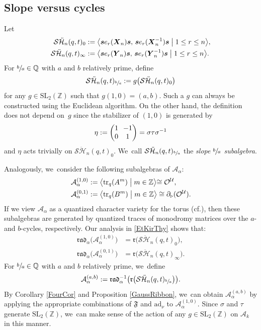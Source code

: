\documentclass[11pt]{article}
\newcommand{\cf}{cf.\xspace}
\newcommand{\SL}{\mathrm{SL}}
\theoremstyle{definition}
\newcommand{\QQ}{\mathbb{Q}}
\newcommand{\ZZ}{\mathbb{Z}}
\newcommand{\OO}{\mathcal{O}}
\newcommand{\UU}{\mathcal{U}}
\newcommand{\AAA}{\mathcal{A}}
\newcommand{\SHH}{\mathcal{S}\ddot{\mathcal{H}}}
\newcommand{\ee}{\boldsymbol{s}}
\newcommand{\ad}{\mathrm{ad}}
\newcommand{\tr}{\mathrm{tr}}
\newcommand{\rrr}{\mathfrak{r}}
\begin{document}
\subsection{Slope versus cycles}
Let
\begin{equation*}
\begin{aligned}
\SHH_n(q,t)_0&:=\bigl\langle\ee e_r(\boldsymbol{X}_n)\ee,\,\ee e_r(\boldsymbol{X}_n^{-1})\ee\bigm| 1\le r\le n\bigr\rangle,
\\
\SHH_n(q,t)_\infty&:=\bigl\langle\ee e_r(\boldsymbol{Y}_n)\ee,\, \ee e_r(\boldsymbol{Y}_n^{-1})\ee\bigm| 1\le r\le n\bigr\rangle.
\end{aligned}
\end{equation*}
For $\sfrac{b}{a}\in\QQ$ with $a$ and $b$ relatively prime, define
\[
\SHH_n(q,t)_{\sfrac{b}{a}}:=g\bigl(\SHH_n(q,t)_0\bigr)
\]
for any $g\in \SL_2(\ZZ)$ such that $g(1,0)=(a,b)$.
Such a $g$ can always be constructed using the Euclidean algorithm.
On the other hand, the definition does not depend on~$g$ since the stabilizer of $(1,0)$ is generated by
\[\arraycolsep3.5pt
\eta:=
\begin{pmatrix}
1 & -1\\
0 & 1
\end{pmatrix}
=\sigma\tau\sigma^{-1}
\]
and $\eta$ acts trivially on $\SHH_n(q,t)_0$. We~call $\SHH_n(q,t)_{\sfrac{b}{a}}$ the \textit{slope $\sfrac{b}{a}$ subalgebra}.

Analogously, we~consider the following subalgebras of $\AAA_\alpha$:
\begin{align*}
\AAA_\alpha^{(1,0)}&:=\bigl\langle\tr_q(A^m)\bigm| m\in\ZZ\bigl\rangle\cong\OO^\UU,\\
\AAA_\alpha^{(0,1)}&:=\bigl\langle\tr_q(B^m)\bigm| m\in\ZZ\bigr\rangle\cong\partial_{\triangleright}(\OO^\UU).
\end{align*}
If we view $\AAA_\alpha$ as a quantized character variety for the torus (\cf \cite{AlekScho, BBJ1, BBJ2}), then these subalgebras are generated by quantized traces of monodromy matrices over the $a$- and $b$-cycles, respectively.
Our analysis in \ref{EtKirThy} shows that:
\begin{align*}
\mathfrak{rad}_\alpha\bigl(\AAA_\alpha^{(1,0)}\bigr)&=\rrr\bigl(\SHH_n(q,t)_0\bigr),\\
\mathfrak{rad}_\alpha\bigl(\AAA_\alpha^{(0,1)}\bigr)&= \rrr\bigl(\SHH_n(q,t)_\infty\bigr).
\end{align*}
For $\sfrac{b}{a}\in\QQ$ with $a$ and $b$ relatively prime, we~define
\[
\AAA_{\alpha}^{(a,b)}:=\mathfrak{rad}_\alpha^{-1}\bigl(\rrr\bigl(\SHH_n(q,t)_{\sfrac{b}{a}} \bigr) \bigr).
\]
By Corollary \ref{FourCor} and Proposition \ref{GaussRibbon}, we~can obtain $\AAA_{\alpha}^{(a,b)}$ by applying the appropriate combinations of $\mathfrak{F}$ and $\ad_{\nu}$ to $\AAA_{\alpha}^{(1,0)}$.
Since $\sigma$ and $\tau$ generate $\SL_2(\ZZ)$, we~can make sense of the action of any $g\in \SL_2(\ZZ)$ on $\AAA_k$ in this manner.
\end{document}
